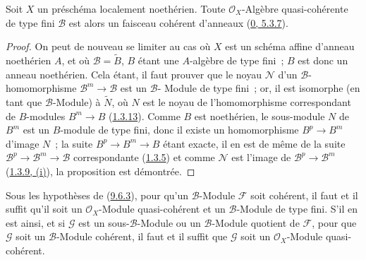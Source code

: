 \begin{proposition}[9.6.3]
\label{I.9.6.3-fr}
Soit $X$ un préschéma localement noethérien. Toute
$\mathscr{O}_X$-Algèbre quasi-cohérente de type fini $\mathscr{B}$ est
alors un faisceau cohérent d'anneaux
(\hyperref[0.5.3.7-fr]{0, 5.3.7}).
\end{proposition}

\begin{proof}
On peut de nouveau se limiter au cas où $X$ est un schéma affine d'anneau
noethérien $A$, et où $\mathscr{B}=\widetilde{B}$, $B$ étant une
$A$-algèbre de type fini~; $B$ est donc un anneau noethérien. Cela étant, il
faut prouver que le noyau $\mathscr{N}$ d'un
$\mathscr{B}$-homomorphisme $\mathscr{B}^m\to\mathscr{B}$ est un
$\mathscr{B}$-
Module de type fini~; or, il est isomorphe (en tant que
$\mathscr{B}$-Module) à $\widetilde{N}$, où $N$ est le noyau de
l'homomorphisme correspondant de $B$-modules $B^m\to B$
(\hyperref[I.1.3.13-fr]{1.3.13}). Comme $B$ est noethérien, le sous-module
$N$ de $B^m$ est un $B$-module de type fini, donc il existe un homomorphisme
$B^p\to B^m$ d'image $N$~; la suite $B^p\to B^m\to B$ étant exacte, il
en est de même de la suite
$\mathscr{B}^p\to\mathscr{B}^m\to\mathscr{B}$ correspondante
(\hyperref[I.1.3.5-fr]{1.3.5}) et comme $\mathscr{N}$ est l'image de
$\mathscr{B}^p\to\mathscr{B}^m$
(\hyperref[I.1.3.9-fr]{1.3.9, (i)}), la proposition est démontrée.
\end{proof}

\begin{corollary}[9.6.4]
\label{I.9.6.4-fr}
Sous les hypothèses de (\hyperref[I.9.6.3-fr]{9.6.3}), pour qu'un
$\mathscr{B}$-Module $\mathscr{F}$ soit cohérent, il faut et il suffit
qu'il soit un $\mathscr{O}_X$-Module quasi-cohérent et un
$\mathscr{B}$-Module de type fini. S'il en est ainsi, et si $\mathscr{G}$
est un sous-$\mathscr{B}$-Module ou un $\mathscr{B}$-Module quotient de
$\mathscr{F}$, pour que $\mathscr{G}$ soit un $\mathscr{B}$-Module
cohérent, il faut et il suffit que $\mathscr{G}$ soit un
$\mathscr{O}_X$-Module quasi-cohérent.
\end{corollary}

